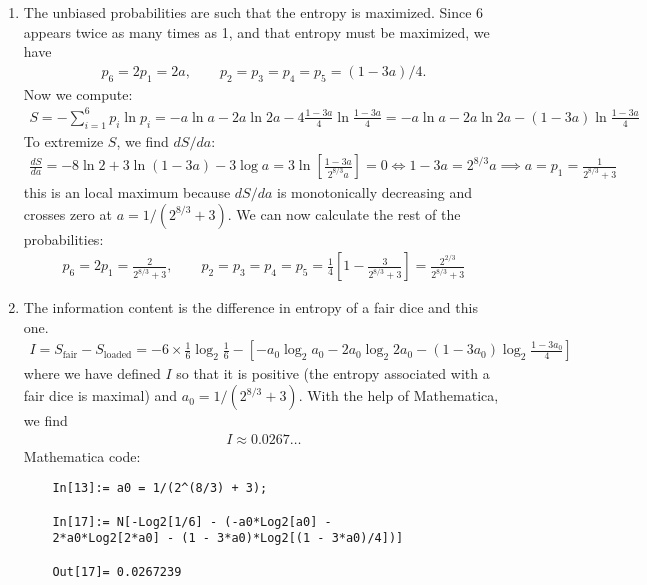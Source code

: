 \documentclass{article}
\theoremstyle{definition}
\newcommand{\f}[2]{\frac{#1}{#2}}
\newcommand{\lb}{\left[}
\newcommand{\rb}{\right]}
\begin{document}
\begin{enumerate}[label=(\alph*)]
	\item The unbiased probabilities are such that the entropy is maximized. Since 6 appears twice as many times as 1, and that entropy must be maximized, we have 
	\begin{align*}
	p_6 = 2p_1 = 2a, \quad\quad p_2 = p_3 = p_4 = p_5 = (1- 3a)/4. 
	\end{align*}
	Now we compute:
	\begin{align*}
	S = -\sum_{i=1}^6 p_i \ln p_i = -a\ln a - 2a \ln 2a - 4\f{1-3a}{4} \ln \f{1-3a}{4} = 
	-a\ln a - 2a \ln 2a - (1-3a) \ln \f{1-3a}{4}
	\end{align*}
	To extremize $S$, we find $dS/da$:
	\begin{align*}
	\f{dS}{da} = -8\ln 2 + 3\ln (1-3a) - 3\log a = 3\ln \lb \f{1-3a}{2^{8/3}a} \rb = 0 \iff 1-3a = 2^{8/3}a \implies a = p_1 = \f{1}{2^{8/3}+3}
	\end{align*}
	this is an local maximum because $dS/da$ is monotonically decreasing and crosses zero at $a = 1/(2^{8/3}+3)$.  We can now calculate the rest of the probabilities:
	\begin{align*}
	\boxed{p_6 = 2p_1 = \f{2}{2^{8/3}+3}, \quad\quad p_2 = p_3 = p_4 = p_5 = \f{1}{4}\lb 1-\f{3}{2^{8/3}+3} \rb = \f{2^{2/3} }{2^{8/3}+3} }
	\end{align*}
	
	\item The information content is the difference in entropy of a fair dice and this one. 
	\begin{align*}
	I = S_\text{fair} - S_\text{loaded}= - 6\times \f{1}{6}\log_2 \f{1}{6} - \lb -a_0\log_2 a_0 - 2a_0 \log_2 2a_0 - (1-3a_0) \log_2 \f{1-3a_0}{4} \rb
	\end{align*}
	where we have defined $I$ so that it is positive (the entropy associated with a fair dice is maximal) and $a_0 = 1/(2^{8/3}+3)$. With the help of Mathematica, we find 
	\begin{align*}
	\boxed{I \approx 0.0267\dots}
	\end{align*}
	Mathematica code:
	\begin{lstlisting}
	In[13]:= a0 = 1/(2^(8/3) + 3);
	
	In[17]:= N[-Log2[1/6] - (-a0*Log2[a0] - 
	2*a0*Log2[2*a0] - (1 - 3*a0)*Log2[(1 - 3*a0)/4])]
	
	Out[17]= 0.0267239
	\end{lstlisting}
\end{enumerate}
\end{document}
